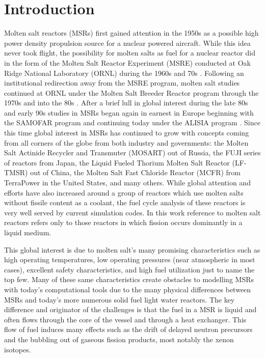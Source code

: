 \chapter{Introduction}\label{ch:intro}

Molten salt reactors (MSRs) first gained attention in the 1950s as a possible
high power density propulsion source for a nuclear powered aircraft. While this
idea never took flight, the possibility for molten salts as fuel for a
nuclear reactor did in the form of the Molten Salt Reactor Experiment (MSRE)
conducted at Oak Ridge National Laboratory (ORNL) during the 1960s and 70s 
\cite{ORNL}. Following an institutional redirection away from the MSRE
program, molten salt studies continued at ORNL under the Molten Salt Breeder
Reactor program through the 1970s and into the 80s \cite{ORNL}. After a
brief lull in global interest during the late 80s and early 90s studies in MSRs
began again in earnest in Europe beginning with the SAMOFAR program and continuing
today under the ALISIA program \cite{SAMOFAR}. Since this time global interest
in MSRs has continued to grow with concepts coming from all corners of the
globe from both industry and governments: the Molten Salt Actinide Recycler and
Transmuter (MOSART) out of Russia, the FUJI series of reactors from Japan, 
the Liquid Fueled Thorium Molten Salt Reactor (LF-TMSR)  out of China, the
Molten Salt Fast Chloride Reactor (MCFR) from TerraPower in the United States,
and many others. While global attention and efforts have also increased around
a group of reactors which use molten salts without fissile content as a coolant,
the fuel cycle analysis of these reactors is very well served by current
simulation codes. In this work reference
to molten salt reactors refers only to those reactors in which fission occurs
dominantly in a liquid medium.

This global interest is due to molten salt's many promising characteristics such
as high operating temperatures, low operating pressures (near atmospheric in
most cases), excellent safety characteristics, and high fuel utilization just
to name the top few. Many of these same characteristics create obstacles to 
modelling MSRs with today's computational tools due to the many physical
differences between MSRs and today's more numerous solid fuel light water
reactors. The key difference and originator of the challenges is that the fuel
in a MSR is liquid and often flows through the core of the vessel and through
a heat exchanger. This flow of fuel induces many effects such as the drift of
delayed neutron precursors and the bubbling out of gaseous fission products,
most notably the xenon isotopes.

